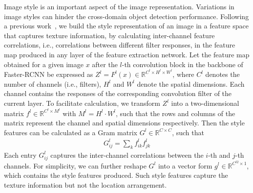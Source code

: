 \documentclass[runningheads]{llncs}
\begin{document}
Image style is an important aspect of the image representation.
Variations in image styles can hinder the cross-domain object detection performance. 
Following a previous work~\cite{Gatys2016Image}, 
we build the style representation of an image in a feature space that captures texture information,
by calculating inter-channel feature correlations, i.e., correlations between
different filter responses,  in the feature map produced in any layer of the feature extraction network.
Let 
the feature map obtained for a given image $x$ after the $l$-th convolution block in the backbone of Faster-RCNN 
be expressed as $Z^l=F^l(x)\in{\mathbb{R}^{C^l\times H^l\times W^l}}$,
where $C^l$ denotes the number of channels (i.e., filters), 
$H^l$ and $W^l$ denote the spatial dimensions. 
Each channel contains the responses of the corresponding convolution filter of the current layer. 
To facilitate calculation, 
we transform $Z^l$ into a two-dimensional matrix $f^l\in {\mathbb{R}^{C^l \times M^l}}$ with $M^l=H^l\cdot W^l$,
such that the rows and columns of the matrix represent the channel and spatial dimensions respectively.
Then the style features can be calculated 
as a Gram matrix ${G}^l \in {\mathbb{R}^{C \times C}}$, such that
\begin{gather}
{G^l_{ij}} = \sum\limits_k {f_{ik}^l f_{jk}^l}
\end{gather}
Each entry $G^l_{ij}$ captures the inter-channel correlations between the $i$-th and $j$-th channels.
For simplicity, we can further reshape $G^l$ into a vector form $g^l\in\mathbb{R}^{C^{l2}\times 1}$,
which contains the style features produced. Such style features capture the texture information
but not the location arrangement.
\end{document}
